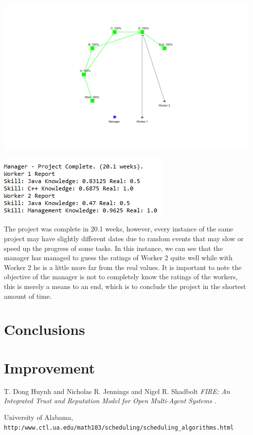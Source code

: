 \documentclass[paper=a4, fontsize=11pt]{scrartcl} %
\numberwithin{equation}{section} %
\numberwithin{figure}{section} %
\numberwithin{table}{section} %
\begin{document}
\includegraphics[scale=0.3]{exp3.png}
\begin{center}
	\includegraphics[scale=1]{data2.png}
\end{center}
The project was complete in 20.1 weeks, however, every instance of the same project may have slightly different dates due to random events that may slow or speed up the progress of some tasks. In this instance, we can see that the manager has managed to guess the ratings of Worker 2 quite well while with Worker 2 he is a little more far from the real values. It is important to note the objective of the manager is not to completely know the ratings of the workers, this is merely a means to an end, which is to conclude the project in the shortest amount of time.
\section{Conclusions}

\section{Improvement}

\newpage
\begin{thebibliography}{9}
	T. Dong Huynh and Nicholas R. Jennings and Nigel R. Shadbolt
	\textit{FIRE: An Integrated Trust and Reputation Model for
		Open Multi-Agent Systems
}. 

	
	University of Alabama,
	\\\texttt{http:/www.ctl.ua.edu/{}math103/scheduling/scheduling\_algorithms.html}
\end{thebibliography}
\end{document}
